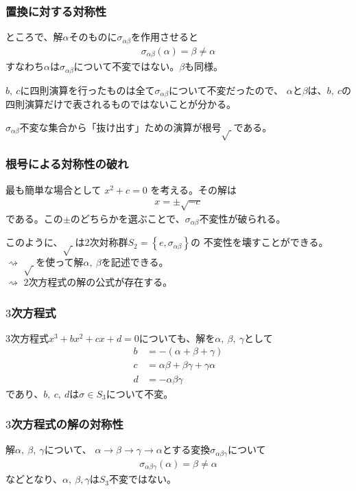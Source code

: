\documentclass[12pt, t]{beamer}
\newcommand{\clr}[1]{\left\{{}#1\right\}{}}
\begin{document}
\begin{frame}
\frametitle{置換に対する対称性}
ところで、解$\alpha$そのものに$\sigma_{\alpha \beta}$を作用させると
\begin{align}
  \sigma_{\alpha \beta}(\alpha) = \beta \neq \alpha
\end{align}
すなわち$\alpha$は$\sigma_{\alpha \beta}$について不変ではない。$\beta$も同様。

$b,\ c$に四則演算を行ったものは全て$\sigma_{\alpha \beta}$について不変だったので、
$\alpha$と$\beta$は、$b,\ c$の四則演算だけで表されるものではないことが分かる。

$\sigma_{\alpha \beta}$不変な集合から「抜け出す」ための演算が\alert{根号$\sqrt{\ }$}である。
\end{frame}

\begin{frame}
\frametitle{根号による対称性の破れ}
最も簡単な場合として $x^2 + c = 0$ を考える。その解は
\begin{align}
  x = \pm \sqrt{-c}
\end{align}
である。この$\pm$のどちらかを選ぶことで、$\sigma_{\alpha \beta}$不変性が破られる。

このように、$\sqrt{\ }$は$2$次対称群$S_2 = \clr{e, \sigma_{\alpha \beta}}$の
不変性を壊すことができる。\\
$\rightsquigarrow$ $\sqrt{\ }$を使って解$\alpha,\ \beta$を記述できる。\\
$\rightsquigarrow$ $2$次方程式の解の公式が存在する。
\end{frame}

\begin{frame}
\frametitle{$3$次方程式}
$3$次方程式$x^3+bx^2+cx+d=0$についても、解を$\alpha,\ \beta,\ \gamma$として
\begin{align}
  b &= -(\alpha + \beta + \gamma) \\
  c &= \alpha \beta + \beta \gamma + \gamma \alpha \\
  d &= -\alpha \beta \gamma
\end{align}
であり、$b,\ c,\ d$は$\sigma \in S_3$について不変。
\end{frame}

\begin{frame}
\frametitle{$3$次方程式の解の対称性}
解$\alpha,\ \beta,\ \gamma$について、
$\alpha \rightarrow \beta \rightarrow \gamma \rightarrow \alpha$とする変換$\sigma_{\alpha \beta \gamma}$について
\begin{align}
  \sigma_{\alpha \beta \gamma}(\alpha) = \beta \neq \alpha
\end{align}
などとなり、$\alpha,\ \beta, \gamma$は$S_3$不変ではない。
\end{frame}
\end{document}
